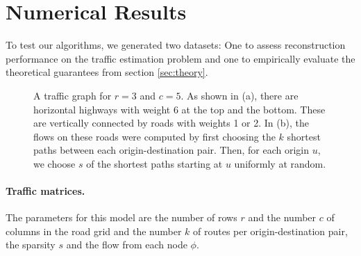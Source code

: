 \documentclass{article} %
\begin{document}
\section{Numerical Results}
To test our algorithms, we generated two datasets: One to assess reconstruction performance on the traffic estimation problem and one to empirically evaluate the theoretical guarantees from section \ref{sec:theory}.
\begin{figure}
  \qquad
  \caption{A traffic graph for $r=3$ and $c=5$. As shown in (a), there are horizontal highways with weight $6$ at the top and the bottom. These are vertically connected by roads with weights 1 or 2. In (b), the flows on these roads were computed by first choosing the $k$ shortest paths between each origin-destination pair. Then, for each origin $u$, we choose $s$ of the shortest paths starting at $u$ uniformly at random. }
\end{figure}
\paragraph{Traffic matrices.} The parameters for this model are the number of rows $r$ and the number $c$ of columns in the road grid and the number $k$ of routes per origin-destination pair, the sparsity $s$ and the flow from each node $\phi$.
\end{document}
